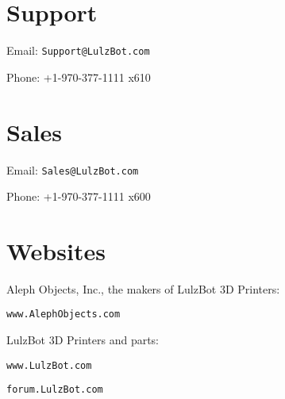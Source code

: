 %
%
%
%
%

\section{Support}
\setlength{\parindent}{0pt}
Email: \texttt{Support@LulzBot.com}

Phone: +1-970-377-1111 x610

\section{Sales}

Email: \texttt{Sales@LulzBot.com}

Phone: +1-970-377-1111 x600

\section{Websites}

Aleph Objects, Inc., the makers of LulzBot 3D Printers:

\texttt{www.AlephObjects.com}


LulzBot 3D Printers and parts:

\texttt{www.LulzBot.com}

\texttt{forum.LulzBot.com}
